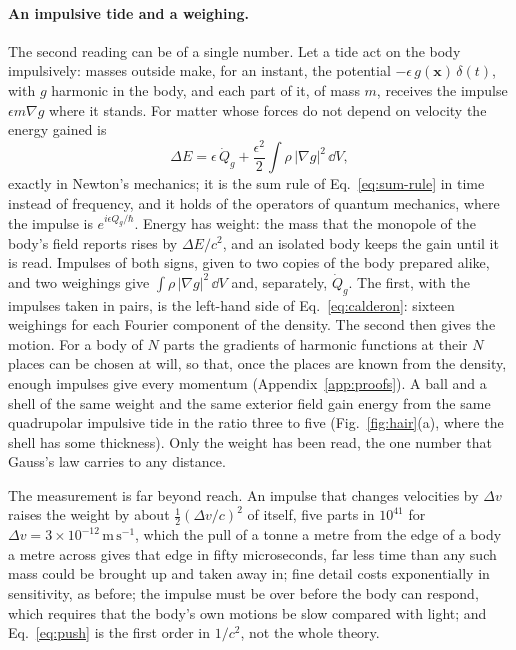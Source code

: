 \paragraph{An impulsive tide and a weighing.} The second reading can be of a single
number. Let a tide act on the body impulsively: masses outside make, for
an instant, the potential $-\epsilon\,g(\mathbf x)\,\delta(t)$, with $g$
harmonic in the body, and each part of it, of mass $m$, receives the impulse
$\epsilon m\nabla g$ where it stands. For matter whose forces do not depend on velocity the energy
gained is
\begin{equation}\label{eq:push}
\Delta E = \epsilon\,\dot Q_g + \frac{\epsilon^2}{2}\int\rho\,|\nabla g|^2\,\dd V ,
\end{equation}
exactly in Newton's mechanics; it is the sum rule of Eq.~\eqref{eq:sum-rule}
in time instead of frequency, and it holds of the operators of quantum
mechanics, where the impulse is $e^{i\epsilon Q_g/\hbar}$. Energy has weight:
the mass that the monopole of the body's field reports rises by $\Delta E/c^2$, and
an isolated body keeps the gain until it is read. Impulses of both signs,
given to two copies of the body prepared alike, and two weighings give $\int\rho\,|\nabla g|^2\,\dd V$ and,
separately, $\dot Q_g$. The first, with the impulses taken in pairs, is the left-hand
side of Eq.~\eqref{eq:calderon}: sixteen weighings for each Fourier component of the
density. The second then gives the motion. For a body of $N$ parts the
gradients of harmonic functions at their $N$ places can be chosen at will, so
that, once the places are known from the density, enough impulses give every
momentum (Appendix~\ref{app:proofs}). A ball and
a shell of the same weight and the same exterior field gain energy from the
same quadrupolar impulsive tide in the ratio three to five
(Fig.~\ref{fig:hair}(a), where the shell has some
thickness). Only the weight has been read, the one
number that Gauss's law carries to any distance.

The measurement is far beyond reach. An impulse that changes velocities by
$\Delta v$ raises the weight by about $\tfrac12(\Delta v/c)^2$ of itself, five
parts in $10^{41}$ for $\Delta v = 3\times10^{-12}\,\mathrm{m\,s^{-1}}$, which the
pull of a tonne a metre from the edge of a body a metre across gives that edge in fifty
microseconds, far less time than any such mass could be brought up and taken
away in; fine detail costs
exponentially in sensitivity, as before; the impulse must be over before the body can respond,
which requires that the body's own motions be slow compared with light; and
Eq.~\eqref{eq:push} is the first order in $1/c^2$, not the whole theory.

